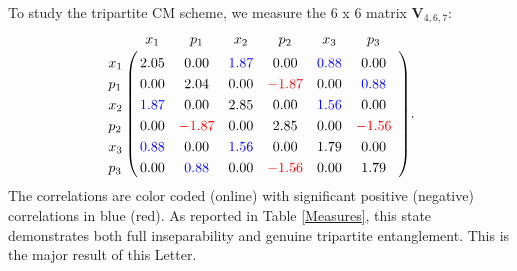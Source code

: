 \documentclass[prl,10pt,twocolumn,superscriptaddress,notitlepage,floatfix,amssymb]{revtex4}
\begin{document}


To study the tripartite CM scheme, we measure the 6 x 6 matrix $\mathbf{V}_{4,6,7}$:
\begin{align*}
	\bordermatrix{
		 & x_1 & p_1 & x_2 & p_2 & x_3 & p_3\ \\
    x_1 & 2.05&0.00&{\color{blue}1.87}&0.00&{\color{blue}0.88}&0.00\ \\
	p_1 & 0.00&2.04&0.00&{\color{red}-1.87}&0.00&{\color{blue}0.88}\ \\
	x_2 & {\color{blue}1.87}&0.00&2.85&0.00&{\color{blue}1.56}&0.00\ \\
	p_2 & 0.00&{\color{red}-1.87}&0.00&2.85&0.00&{\color{red}-1.56}\ \\
	x_3 & {\color{blue}0.88}&0.00&{\color{blue}1.56}&0.00&1.79&0.00\ \\
	p_3 & 0.00&{\color{blue}0.88}&0.00&{\color{red}-1.56}&0.00&1.79\ }.
\end{align*}
The correlations are color coded (online) with significant positive (negative) correlations in blue (red). As reported in Table \ref{Measures}, this state demonstrates both full inseparability and genuine tripartite entanglement.  This is the major result of this Letter.
\end{document}
